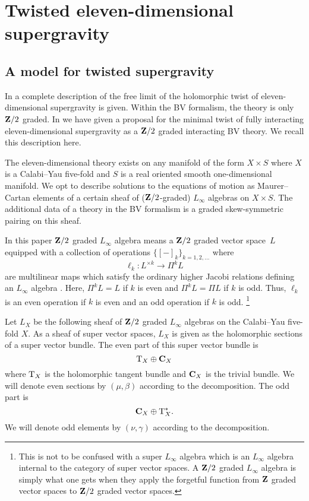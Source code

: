 \documentclass[11pt]{amsart}
\begin{document}
\section{Twisted eleven-dimensional supergravity}

\subsection{A model for twisted supergravity}

In \cite{SWspinor} a complete description of the free limit of the holomorphic twist of eleven-dimensional supergravity is given.
Within the BV formalism, the theory is only $\mathbf{Z}/2$ graded.
In \cite{RSW} we have given a proposal for the minimal twist of fully interacting eleven-dimensional supergravity as a $\mathbf{Z}/2$ graded interacting BV theory.
We recall this description here.

The eleven-dimensional theory exists on any manifold of the form $X \times S$ where $X$ is a Calabi--Yau five-fold and $S$ is a real oriented smooth one-dimensional manifold. 
We opt to describe solutions to the equations of motion as Maurer--Cartan elements of a certain sheaf of ($\mathbf{Z}/2$-graded) $L_\infty$ algebras on $X \times S$.
The additional data of a theory in the BV formalism is a graded skew-symmetric pairing on this sheaf.

%

\parsec[s:Lsugra]

In this paper $\mathbf{Z}/2$ graded $L_\infty$ algebra means a $\mathbf{Z}/2$ graded vector space~$L$ equipped with a collection of operations $\{[-]_k\}_{k = 1,2,\ldots}$ where 
\[
\ell_k \colon L^{\times k} \to \Pi^k L 
\]
are multilinear maps which satisfy the ordinary higher Jacobi relations defining an $L_\infty$ algebra \cite{??}. 
Here, $\Pi^k L = L$ if $k$ is even and $\Pi^k L = \Pi L$ if $k$ is odd. 
Thus, $\ell_k$ is an even operation if $k$ is even and an odd operation if $k$ is odd. 
\footnote{This is not to be confused with a super $L_\infty$ algebra which is an $L_\infty$ algebra internal to the category of super vector spaces.
A $\mathbf{Z}/2$ graded $L_\infty$ algebra is simply what one gets when they apply the forgetful function from $\mathbf{Z}$ graded vector spaces to $\mathbf{Z}/2$ graded vector spaces.}

Let $L_X$ be the following sheaf of $\mathbf{Z}/2$ graded $L_\infty$ algebras on the Calabi--Yau five-fold $X$.
As a sheaf of super vector spaces, $L_X$ is given as the holomorphic sections of a super vector bundle. 
The even part of this super vector bundle is
\[
{\rm T}_X \oplus \mathbf{C}_X 
\]
where ${\rm T}_X$ is the holomorphic tangent bundle and $\mathbf{C}_X$ is the trivial bundle.
We will denote even sections by $(\mu, \beta)$ according to the decomposition. 
The odd part is 
\[
\mathbf{C}_X \oplus {\rm T}^*_X .
\]
We will denote odd elements by $(\nu, \gamma)$ according to the decomposition. 
\end{document}

